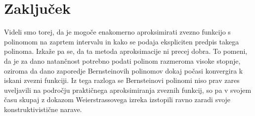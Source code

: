 \documentclass[a4paper, reqno]{amsart}
\theoremstyle{theorem}
\theoremstyle{definition}
\begin{document}
\section{Zaključek}

\par
Videli smo torej, da je mogoče enakomerno aproksimirati zvezno funkcijo s polinomom na zaprtem intervalu in kako se podaja ekspliciten predpis takega polinoma. Izkaže pa se, 
da ta metoda aproksimacije ni precej dobra. To pomeni, da je za dano natančnost potrebno
podati polinom razmeroma visoke stopnje, oziroma da dano zaporedje Bernsteinovih
polinomov dokaj počasi konvergira k iskani zvezni funkciji. Iz tega razloga se 
Bernsteinovi polinomi niso prav zares uveljavili na področju praktičnega aproksimiranja zveznih 
funkcij, so pa v svojem času skupaj z dokazom Weierstrassovega izreka izstopili 
ravno zaradi svoje konstruktivistične narave.  

\nocite{*}



\end{document}
